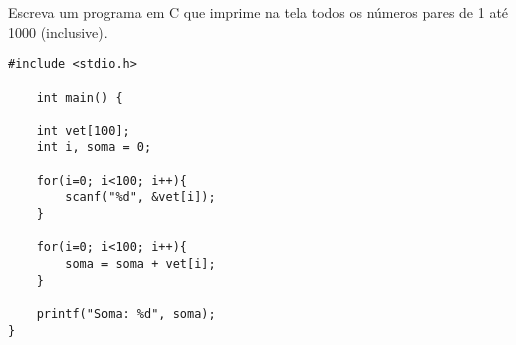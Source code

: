 
\question[10]

Escreva um programa em C que imprime na tela todos os números pares de 1 até 1000 (inclusive).

\begin{solution}
\begin{lstlisting}
#include <stdio.h>

	int main() {
	
	int vet[100];
	int i, soma = 0;
	
	for(i=0; i<100; i++){
		scanf("%d", &vet[i]);
	}
	
	for(i=0; i<100; i++){
		soma = soma + vet[i];
	}
	
	printf("Soma: %d", soma);
}
\end{lstlisting}
\end{solution}